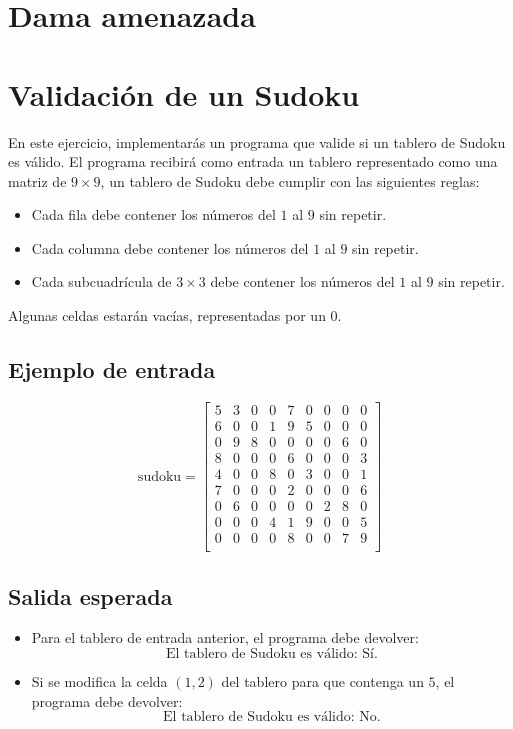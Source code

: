 \section{Dama amenazada}


\section{Validación de un Sudoku}
En este ejercicio, implementarás un programa que valide si un tablero de Sudoku es válido. El programa recibirá como entrada un tablero representado como una matriz de \(9 \times 9\), un tablero de Sudoku debe cumplir con las siguientes reglas:
\begin{itemize}
    \item Cada fila debe contener los números del \(1\) al \(9\) sin repetir.
    \item Cada columna debe contener los números del \(1\) al \(9\) sin repetir.
    \item Cada subcuadrícula de \(3 \times 3\) debe contener los números del \(1\) al \(9\) sin repetir.
\end{itemize}

Algunas celdas estarán vacías, representadas por un \(0\).

\subsection*{Ejemplo de entrada}
\[
\text{sudoku} = 
\begin{bmatrix}
5 & 3 & 0 & 0 & 7 & 0 & 0 & 0 & 0 \\
6 & 0 & 0 & 1 & 9 & 5 & 0 & 0 & 0 \\
0 & 9 & 8 & 0 & 0 & 0 & 0 & 6 & 0 \\
8 & 0 & 0 & 0 & 6 & 0 & 0 & 0 & 3 \\
4 & 0 & 0 & 8 & 0 & 3 & 0 & 0 & 1 \\
7 & 0 & 0 & 0 & 2 & 0 & 0 & 0 & 6 \\
0 & 6 & 0 & 0 & 0 & 0 & 2 & 8 & 0 \\
0 & 0 & 0 & 4 & 1 & 9 & 0 & 0 & 5 \\
0 & 0 & 0 & 0 & 8 & 0 & 0 & 7 & 9 \\
\end{bmatrix}
\]
\subsection*{Salida esperada}

\begin{itemize}
    \item Para el tablero de entrada anterior, el programa debe devolver:
    \[
    \text{El tablero de Sudoku es válido: Sí.}
    \]
    \item Si se modifica la celda \((1,2)\) del tablero para que contenga un \(5\), el programa debe devolver:
    \[
    \text{El tablero de Sudoku es válido: No.}
    \]
\end{itemize}

